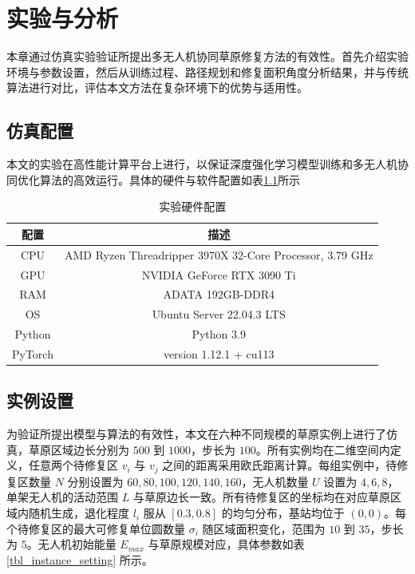 \documentclass[AutoFakeBold]{LZUThesis}
\begin{document}
\chapter{实验与分析}
本章通过仿真实验验证所提出多无人机协同草原修复方法的有效性。首先介绍实验环境与参数设置，然后从训练过程、路径规划和修复面积角度分析结果，并与传统算法进行对比，评估本文方法在复杂环境下的优势与适用性。
\label{sub:实验配置表格}

\section{仿真配置}
本文的实验在高性能计算平台上进行，以保证深度强化学习模型训练和多无人机协同优化算法的高效运行。具体的硬件与软件配置如表\ref{tbl_hardware_config}所示
\begin{table}[htbp]
	\centering
	\caption{实验硬件配置}
	\begin{tabular}{cc}
		\toprule
		配置      & 描述                                                       \\
		\midrule
		CPU     & AMD Ryzen Threadripper 3970X 32-Core Processor, 3.79 GHz \\
		GPU     & NVIDIA GeForce RTX 3090 Ti                               \\
		RAM     & ADATA 192GB-DDR4                                         \\
		OS      & Ubuntu Server 22.04.3 LTS                                \\
		Python  & Python 3.9                                               \\
		PyTorch & version 1.12.1 + cu113                                   \\
		\bottomrule
	\end{tabular}
	\label{tbl_hardware_config}
\end{table}

\section{实例设置}
为验证所提出模型与算法的有效性，本文在六种不同规模的草原实例上进行了仿真，草原区域边长分别为 $500$ 到 $1000$，步长为 $100$。所有实例均在二维空间内定义，任意两个待修复区 $v_i$ 与 $v_j$ 之间的距离采用欧氏距离计算。每组实例中，待修复区数量 $N$ 分别设置为 $60, 80, 100, 120, 140, 160$，无人机数量 $U$ 设置为 $4, 6, 8$，单架无人机的活动范围 $L$ 与草原边长一致。所有待修复区的坐标均在对应草原区域内随机生成，退化程度 $l_i$ 服从 $[0.3, 0.8]$ 的均匀分布，基站均位于 $(0,0)$。每个待修复区的最大可修复单位圆数量 $\sigma_i$ 随区域面积变化，范围为 $10$ 到 $35$，步长为 $5$。无人机初始能量 $E_{max}$ 与草原规模对应，具体参数如表\ref{tbl_instance_setting} 所示。
\end{document}

